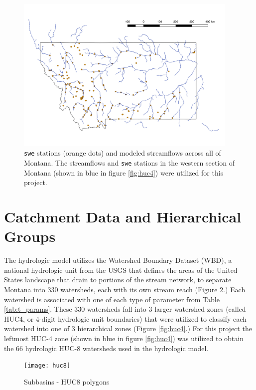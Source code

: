 \begin{figure}[h]
    \centering
    \includegraphics[width=0.95\textwidth]{stations}
    \caption{\texttt{swe} stations (orange dots) and modeled streamflows across all of Montana. The streamflows and \texttt{swe} stations in the western section of Montana (shown in blue in figure {\ref{fig:huc4}}) were utilized for this project.}
    \label{fig:stations}
\end{figure}

\section{Catchment Data and Hierarchical Groups}

The hydrologic model utilizes the Watershed Boundary Dataset (WBD), a national hydrologic unit from the USGS that defines the areas of the United States landscape that drain to portions of the stream network, to separate Montana into 330 watersheds, each with its own stream reach (Figure \ref{fig:huc8}.) Each watershed is associated with one of each type of parameter from Table \ref{tab:t_params}. These 330 watersheds fall into 3 larger watershed zones (called HUC4, or 4-digit hydrologic unit boundaries) that were utilized to classify each watershed into one of 3 hierarchical zones (Figure \ref{fig:huc4}.) For this project the leftmost HUC-4 zone (shown in blue in figure \ref{fig:huc4}) was utilized to obtain the 66 hydrologic HUC-8 watersheds used in the hydrologic model.

\begin{figure}[h]
    \centering
    \texttt{[image: huc8]}
    \caption{Subbasins - HUC8 polygons}
    \label{fig:huc8}
\end{figure}

